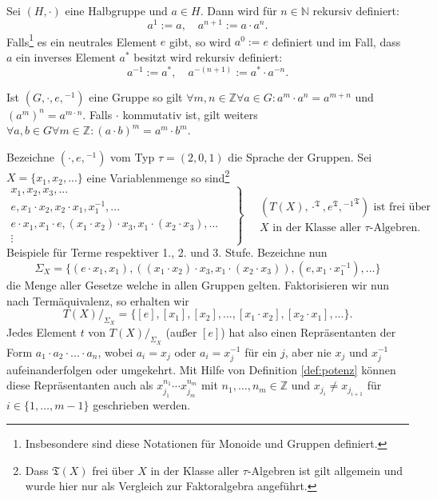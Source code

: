 
\begin{definition}\label{def:potenz}
    Sei $(H,\cdot)$ eine Halbgruppe und $a\in H$. Dann wird für $n\in\mathbb{N}$ rekursiv definiert:
    \[a^1:=a,\quad a^{n+1}:=a\cdot a^n.\]
    Falls\footnote{Insbesondere sind diese Notationen für Monoide und Gruppen definiert.} es ein neutrales Element $e$ gibt, so wird $a^0:=e$ definiert und im Fall, dass $a$ ein inverses Element $a^*$ besitzt
    wird rekursiv definiert:
    \[a^{-1}:=a^*,\quad a^{-(n+1)}:=a^*\cdot a^{-n}.\]
\end{definition}

\begin{remark}
    Ist $(G,\cdot,e,{}^{-1})$ eine Gruppe so gilt $\forall m,n\in\mathbb{Z}\forall a\in G:a^m\cdot a^n=a^{m+n}$ und $(a^m)^n=a^{m\cdot n}$.
    Falls $\cdot$ kommutativ ist, gilt weiters $\forall a,b\in G\forall m\in\mathbb{Z}:(a\cdot b)^m=a^m\cdot b^m$.
\end{remark}

\begin{example}\label{ex:gruppenterme}
    Bezeichne $(\cdot, e, {}^{-1})$ vom Typ $\tau = (2,0,1)$ die Sprache der Gruppen. Sei $X = \{ x_1, x_2, ... \}$ eine Variablenmenge so sind\footnote{Dass $\mathfrak{T}(X)$ frei über $X$ in der Klasse aller $\tau$-Algebren ist gilt allgemein und wurde hier nur als Vergleich zur Faktoralgebra angeführt.}
    $$ \left. \begin{matrix} x_1, x_2, x_3, ... \\ e, x_1 \cdot x_2, x_2 \cdot x_1, x_1^{-1}, ... \\ e \cdot x_1, x_1 \cdot e, (x_1 \cdot x_2) \cdot x_3, x_1 \cdot (x_2 \cdot x_3), ... \\ \vdots \end{matrix} \quad \right\} \quad \begin{matrix} (T(X), \cdot^\mathfrak{T}, e^\mathfrak{T}, {{}^{-1}}^\mathfrak{T}) \textrm{ ist frei  über} \\ X \textrm{ in der Klasse aller $\tau$-Algebren.} \end{matrix} $$
    Beispiele für Terme respektiver 1., 2. und 3. Stufe. Bezeichne nun
    $$ \Sigma_X = \{ (e \cdot x_1, x_1), ((x_1 \cdot x_2) \cdot x_3, x_1 \cdot (x_2 \cdot x_3)), (e, x_1 \cdot x_1^{-1}), ... \} $$
    die Menge aller Gesetze welche in allen Gruppen gelten. Faktorisieren wir nun nach Term\-äquivalenz, so erhalten wir
    $$ T(X) /_{\Sigma_X} = \{ [e], [x_1], [x_2], ..., [x_1 \cdot x_2], [x_2 \cdot x_1], ... \}. $$
    Jedes Element $t$ von $T(X) /_{\Sigma_X}$ (außer $[e]$) hat also einen Repräsentanten der Form $a_1 \cdot a_2 \cdot ... \cdot a_n$, wobei $a_i = x_j$ oder $a_i = x_j^{-1}$ für ein $j$, aber nie $x_j$ und $x_j^{-1}$ aufeinanderfolgen oder umgekehrt.
    Mit Hilfe von Definition \ref*{def:potenz} können diese Repräsentanten auch als $x_{j_1}^{n_1}\cdots x_{j_m}^{n_m}$ mit $n_1,\ldots,n_m\in\mathbb{Z}$ und $x_{j_i}\neq x_{j_{i+1}}$
    für $i\in\{1,\ldots,m-1\}$ geschrieben werden.
\end{example}

